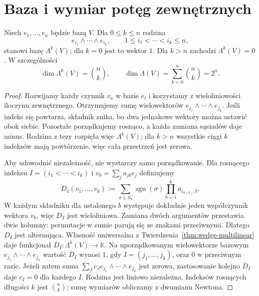 \section{Baza i wymiar potęg zewnętrznych}
\label{sec:baza-zewnetrzna}

\begin{twierdzenie}
\label{thm:wedge-baza}
Niech $e_1,\ldots,e_n$ będzie bazą $V$. Dla $0\leq k\leq n$
rodzina
\[
 e_{i_1}\wedge\cdots\wedge e_{i_k},
 \qquad 1\leq i_1<\cdots<i_k\leq n,
\]
stanowi bazę $\Lambda^k(V)$; dla $k=0$ jest to wektor $1$.
Dla $k>n$ zachodzi $\Lambda^k(V)=0$. W szczególności
\begin{equation}\label{eq:wedge-wymiar}
 \dim\Lambda^k(V)=\binom nk,\qquad
 \dim\Lambda(V)=\sum_{k=0}^n\binom nk=2^n.
\end{equation}
\end{twierdzenie}
\begin{proof}
Rozwijamy każdy czynnik $v_a$ w bazie $e_i$ i korzystamy
z wieloliniowości iloczynu zewnętrznego. Otrzymujemy sumę
wielowektorów $e_{j_1}\wedge\cdots\wedge e_{j_k}$.
Jeśli indeks się powtarza, składnik znika, bo dwa jednakowe
wektory można ustawić obok siebie. Pozostałe porządkujemy
rosnąco, a każda zamiana sąsiadów daje minus. Rodzina
z tezy rozpięła więc $\Lambda^k(V)$; dla $k>n$ wszystkie
ciągi $k$ indeksów mają powtórzenie, więc
cała przestrzeń jest zerowa.

Aby udowodnić niezależność, nie wystarczy samo porządkowanie.
Dla rosnącego indeksu $I=(i_1<\cdots<i_k)$ i
$v_b=\sum_j a_{jb}e_j$ definiujemy
\begin{equation}\label{eq:wedge-wspolrzedne-minor}
 D_I(v_1,\ldots,v_k)
 :=\sum_{\sigma\in S_k}\operatorname{sgn}(\sigma)
 \prod_{b=1}^k a_{i_{\sigma(b)},b}.
\end{equation}
W każdym składniku dla ustalonego $b$ występuje dokładnie
jeden współczynnik wektora $v_b$, więc $D_I$ jest
wieloliniowa. Zamiana dwóch argumentów przestawia dwie
kolumny: permutacje w sumie parują się ze znakami przeciwnymi.
Dlatego $D_I$ jest alternująca. Własność uniwersalna z
Twierdzenia~\ref{thm:wedge-multilinear} daje funkcjonał
$\overline D_I\colon\Lambda^k(V)\to\mathbb K$.
Na uporządkowanym wielowektorze bazowym $e_{j_1}\wedge\cdots
\wedge e_{j_k}$ wartość $\overline D_I$ wynosi $1$,
gdy $I=(j_1,\ldots,j_k)$, oraz $0$ w przeciwnym razie.
Jeżeli zatem suma $\sum_J c_J e_{j_1}\wedge\cdots\wedge e_{j_k}$
jest zerowa, zastosowanie kolejno $\overline D_I$ daje
$c_I=0$ dla każdego $I$. Rodzina jest liniowo niezależna.
Indeksów rosnących długości $k$ jest $\binom nk$;
sumę wymiarów obliczamy z dwumianu Newtona.
\end{proof}

